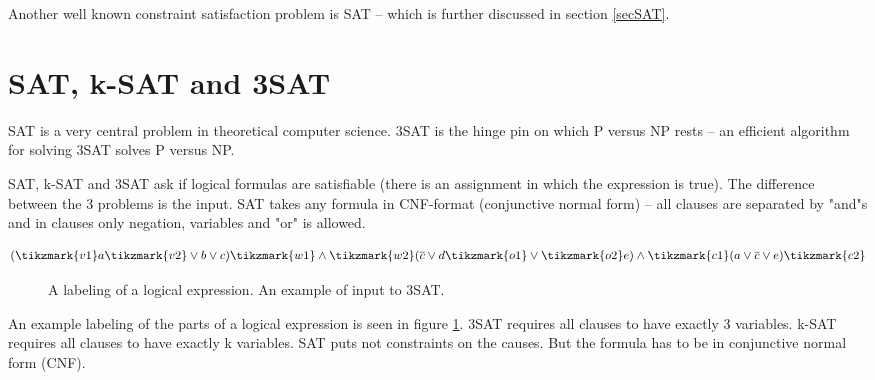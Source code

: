 \documentclass[msc,lith,english]{liuthesis}
\begin{document}
Another well known constraint satisfaction problem is SAT -- which is further discussed in section \ref{secSAT}.

\section{SAT, k-SAT and 3SAT}
SAT is a very central problem in theoretical computer science. 3SAT is the
hinge pin on which P versus NP rests -- an efficient algorithm for solving 3SAT
solves P versus NP.

SAT, k-SAT and 3SAT ask if logical formulas are satisfiable (there is an assignment in which the expression is true).
The difference between the 3 problems is the input. SAT takes any formula in
CNF-format (conjunctive normal form) -- all clauses are separated by "and"s and
in clauses only negation, variables and "or" is allowed.

$$
  (\tikzmark{v1}a\tikzmark{v2} \vee b \vee c) \tikzmark{w1}\wedge\tikzmark{w2} (\overline{c} \vee d \tikzmark{o1}\vee\tikzmark{o2} e) \wedge \tikzmark{c1}(a \vee \overline{c} \vee e)\tikzmark{c2}
$$
\begin{figure}[h]
  \caption{A labeling of a logical expression. An example of input to 3SAT.}
  \label{figExSAT}
\end{figure}


An example labeling of the  parts of a logical expression is seen in figure
\ref{figExSAT}. 3SAT requires all clauses to have exactly 3 variables. k-SAT requires all clauses to have exactly k variables. SAT puts not constraints on the causes. But the formula has to be in conjunctive normal form (CNF).
\end{document}
